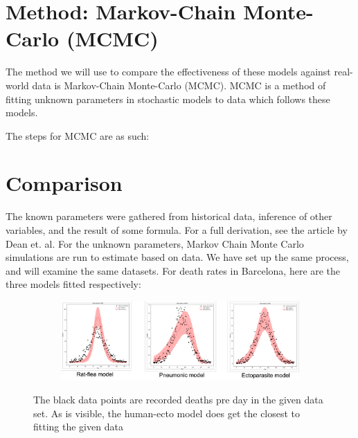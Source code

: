\documentclass [letterpaper, 12pt] {article}
\begin{document}
\pagebreak

\section{Method: Markov-Chain Monte-Carlo (MCMC)}

The method we will use to compare the effectiveness of these models against real-world data is Markov-Chain Monte-Carlo (MCMC). MCMC is a method of fitting unknown parameters in stochastic models to data which follows these models.

The steps for MCMC are as such:




\newpage



\newpage

\section {Comparison}

The known parameters were gathered from historical data, inference of other variables, and the result of some formula. For a full derivation, see the article by Dean et. al. \cite{Dean1304}
For the unknown parameters, Markov Chain Monte Carlo simulations are run to estimate based on data. We have set up the same process, and will examine the same datasets. For death rates in Barcelona, here are the three models fitted respectively:

\begin{figure}[h!]
	\begin{subfigure}{1\textwidth}
		\includegraphics[width=\linewidth]{Figures/models1.png}
	\end{subfigure}\hspace{\fill}
	\caption{The black data points are recorded deaths pre day in the given data set. As is visible, the human-ecto model does get the closest to fitting the given data} 
\end{figure}
\end{document}
